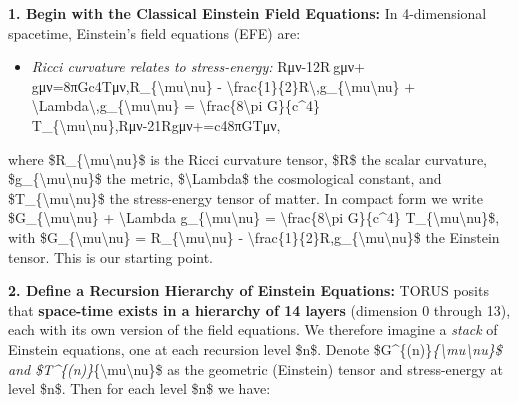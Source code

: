 \documentclass[
]{article}
\begin{document}
{\textbf{1. Begin with the Classical Einstein Field Equations:} In
4-dimensional spacetime, Einstein's field equations (EFE) are:

\begin{itemize}
\item
  \emph{Ricci curvature relates to stress-energy:}
  Rμν-12R gμν+\Lambda gμν=8πGc4Tμν,R\_\{\textbackslash mu\textbackslash nu\} -
  \textbackslash frac\{1\}\{2\}R\textbackslash,g\_\{\textbackslash mu\textbackslash nu\}
  +
  \textbackslash Lambda\textbackslash,g\_\{\textbackslash mu\textbackslash nu\}
  = \textbackslash frac\{8\textbackslash pi G\}\{c\^{}4\}
  T\_\{\textbackslash mu\textbackslash nu\},Rμν\hspace{0pt}-21\hspace{0pt}Rgμν\hspace{0pt}+\hspace{0pt}=c48πG\hspace{0pt}Tμν\hspace{0pt},
\end{itemize}

where \$R\_\{\textbackslash mu\textbackslash nu\}\$ is the Ricci
curvature tensor, \$R\$ the scalar curvature,
\$g\_\{\textbackslash mu\textbackslash nu\}\$ the metric,
\$\textbackslash Lambda\$ the cosmological constant, and
\$T\_\{\textbackslash mu\textbackslash nu\}\$ the stress-energy tensor
of matter. In compact form we write
\$G\_\{\textbackslash mu\textbackslash nu\} + \textbackslash Lambda
g\_\{\textbackslash mu\textbackslash nu\} =
\textbackslash frac\{8\textbackslash pi G\}\{c\^{}4\}
T\_\{\textbackslash mu\textbackslash nu\}\$, with
\$G\_\{\textbackslash mu\textbackslash nu\} =
R\_\{\textbackslash mu\textbackslash nu\} -
\textbackslash frac\{1\}\{2\}R,g\_\{\textbackslash mu\textbackslash nu\}\$
the Einstein tensor. This is our starting point\hspace{0pt}.

\textbf{2. Define a Recursion Hierarchy of Einstein Equations:} TORUS
posits that \textbf{space-time exists in a hierarchy of 14 layers}
(dimension 0 through 13), each with its own version of the field
equations\hspace{0pt}. We therefore imagine a \emph{stack} of Einstein
equations, one at each recursion level \$n\$. Denote
\$G\^{}\{(n)\}\emph{\{\textbackslash mu\textbackslash nu\}\$ and
\$T\^{}\{(n)\}}\{\textbackslash mu\textbackslash nu\}\$ as the geometric
(Einstein) tensor and stress-energy at level \$n\$. Then for each level
\$n\$ we have:

}
\end{document}
